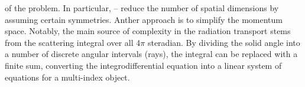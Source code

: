 of the problem. In particular, -- reduce the number of spatial dimensions by assuming certain symmetries.
Anther approach is to simplify the momentum space. 
%
%
Notably, the main source of complexity in the radiation transport stems from the scattering 
integral over all 4$\pi$ steradian.
By dividing the solid angle into a number of discrete angular intervals (rays), the integral can be replaced with a
finite sum, converting the integrodifferential equation into a linear system of equations for a multi-index object. 
%
